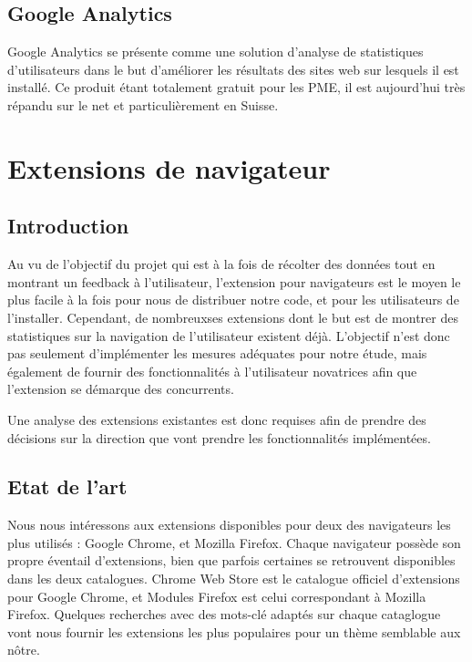 	\subsection{Google Analytics}

		Google Analytics se présente comme une solution d'analyse de statistiques d'utilisateurs dans le but d'améliorer les résultats des sites web sur lesquels il est installé. Ce produit étant totalement gratuit pour les PME, il est aujourd'hui très répandu sur le net et particulièrement en Suisse\cite{analytics-usage}.

\section{Extensions de navigateur}

	\subsection{Introduction}

		Au vu de l'objectif du projet qui est à la fois de récolter des données tout en montrant un feedback à l'utilisateur, l'extension pour navigateurs est le moyen le plus facile à la fois pour nous de distribuer notre code, et pour les utilisateurs de l'installer. Cependant, de nombreuxses extensions dont le but est de montrer des statistiques sur la navigation de l'utilisateur existent déjà. L'objectif n'est donc pas seulement d'implémenter les mesures adéquates pour notre étude, mais également de fournir des fonctionnalités à l'utilisateur novatrices afin que l'extension se démarque des concurrents.

		Une analyse des extensions existantes est donc requises afin de prendre des décisions sur la direction que vont prendre les fonctionnalités implémentées.

	\subsection{Etat de l'art}

		Nous nous intéressons aux extensions disponibles pour deux des navigateurs les plus utilisés : Google Chrome, et Mozilla Firefox. Chaque navigateur possède son propre éventail d'extensions, bien que parfois certaines se retrouvent disponibles dans les deux catalogues. Chrome Web Store\cite{chromewebstore} est le catalogue officiel d'extensions pour Google Chrome, et Modules Firefox\cite{modulesfirefox} est celui correspondant à Mozilla Firefox. Quelques recherches avec des mots-clé adaptés sur chaque cataglogue vont nous fournir les extensions les plus populaires pour un thème semblable aux nôtre.

